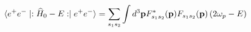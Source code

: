 \begin{equation}
\langle e^{+}e^{-}\mid :\widehat{H}_{0}-E:\mid e^{+}e^{-}\rangle =\underset{%
s_{1}s_{2}}{\sum }\int d^{3}\mathbf{p}F_{s_{1}s_{2}}^{\ast }(\mathbf{p}%
)F_{s_{1}s_{2}}(\mathbf{p})\left( 2\omega _{p}-E\right)
\end{equation}


